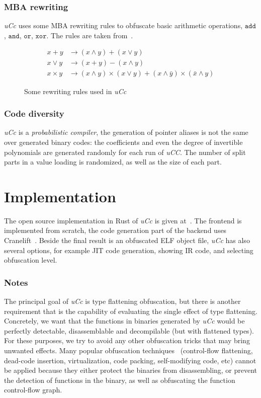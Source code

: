 \documentclass[compsoc,conference,a4paper,10pt,times]{IEEEtran}
\begin{document}
\subsubsection*{MBA rewriting}
\emph{uCc} uses some MBA rewriting rules to obfuscate basic arithmetic operations, $\mathtt{add}$,
$\mathtt{and}$, $\mathtt{or}$, $\mathtt{xor}$. The rules are taken from~\cite{eyrolles_obfuscation_2017}.
\begin{figure}[hb]
  \begin{align*}
    x + y &\rightarrow (x \wedge y) + (x \vee y) \\
    x \vee y &\rightarrow (x + y) - (x \wedge y) \\
    x \times y &\rightarrow (x \wedge y) \times (x \vee y) + (x \wedge \bar{y}) \times (\bar{x} \wedge y)
  \end{align*}
  \caption{Some rewriting rules used in \emph{uCc}}
\end{figure}


\subsubsection*{Code diversity}
\emph{uCc} is a \emph{probabilistic compiler}, the generation of pointer aliases is not the same over generated
binary codes: the coefficients and even the degree of invertible polynomials are generated randomly for
each run of \emph{uCC}. The number of split parts in a value loading is randomized, as well as the size of each part.

\section{Implementation}
\noindent
The open source implementation in Rust of \emph{uCc} is given at~\cite{ta_ucc_nodate}. The frontend is
implemented from scratch, the code generation part of the backend uses Cranelift~\cite{noauthor_cranelift_nodate}.
Beside the final result is an obfuscated ELF object file, \emph{uCc} has also several options, for example
JIT code generation, showing IR code, and selecting obfuscation level.

\subsubsection*{Notes}
\noindent
The principal goal of \emph{uCc} is type flattening obfuscation, but there is another requirement
that is the capability of evaluating the single effect of type flattening. Concretely,
we want that the functions in binaries generated by \emph{uCc} would be perfectly detectable,
disassemblable and decompilable (but with flattened types). For these purposes, we try to avoid any
other obfuscation tricks that may bring unwanted effects. Many
popular obfuscation techniques~\cite{banescu_tutorial_2018,collberg_surreptitious_2009}
(control-flow flattening, dead-code insertion, virtualization, code packing, self-modifying code, etc)
cannot be applied because they either protect the binaries from disassembling, or prevent the detection of
functions in the binary, as well as obfuscating the function control-flow graph.
\end{document}

